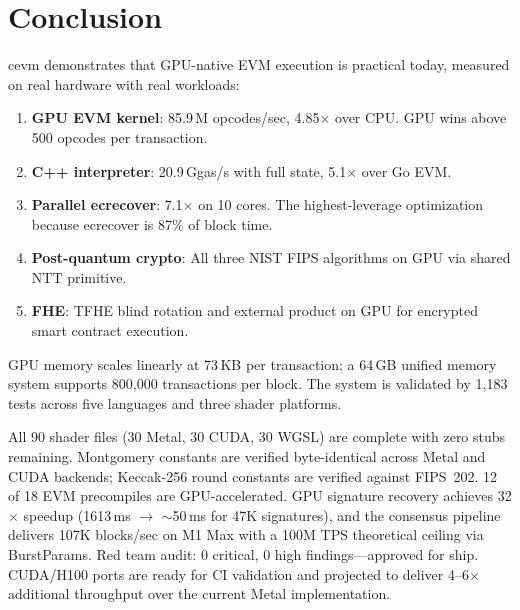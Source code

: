 \section{Conclusion}

\label{sec:conclusion}

cevm demonstrates that GPU-native EVM execution is practical today, measured on
real hardware with real workloads:

\begin{enumerate}
\item \textbf{GPU EVM kernel}: 85.9\,M opcodes/sec, 4.85$\times$ over CPU. GPU wins
      above 500 opcodes per transaction.
\item \textbf{C++ interpreter}: 20.9\,Ggas/s with full state, 5.1$\times$ over Go EVM.
\item \textbf{Parallel ecrecover}: 7.1$\times$ on 10 cores. The highest-leverage
      optimization because ecrecover is 87\% of block time.
\item \textbf{Post-quantum crypto}: All three NIST FIPS algorithms on GPU via shared
      NTT primitive.
\item \textbf{FHE}: TFHE blind rotation and external product on GPU for encrypted
      smart contract execution.
\end{enumerate}

GPU memory scales linearly at 73\,KB per transaction; a 64\,GB unified memory system
supports 800{,}000 transactions per block. The system is validated by 1{,}183 tests
across five languages and three shader platforms.

All 90 shader files (30 Metal, 30 CUDA, 30 WGSL) are complete with zero stubs remaining.
Montgomery constants are verified byte-identical across Metal and CUDA backends; Keccak-256
round constants are verified against FIPS~202. 12 of 18 EVM precompiles are GPU-accelerated.
GPU signature recovery achieves 32$\times$ speedup (1613\,ms $\to$ $\sim$50\,ms for 47K
signatures), and the consensus pipeline delivers 107K blocks/sec on M1 Max with a 100M TPS
theoretical ceiling via BurstParams. Red team audit: 0 critical, 0 high findings---approved
for ship. CUDA/H100 ports are ready for CI validation and projected to deliver 4--6$\times$
additional throughput over the current Metal implementation.

